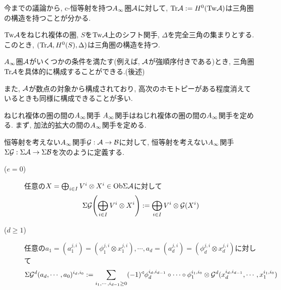 \documentclass[aspectratio=169, dvipdfmx, 8pt, notheorems, uplatex]{beamer}
\begin{document}
\begin{frame}
  今までの議論から, c-恒等射を持つ$A_\infty$圏$\mathcal{A}$に対して, $\mathrm{Tr}\mathcal{A} := H^0(\mathrm{Tw}\mathcal{A})$は三角圏の構造を持つことが分かる. 
  
  \begin{theorem}
    $\mathrm{Tw}\mathcal{A}$をねじれ複体の圏, $S$を$\mathrm{Tw}\mathcal{A}$上のシフト関手, $\Delta$を完全三角の集まりとする.
    このとき, $(\mathrm{Tr}\mathcal{A}, H^0(S), \Delta)$は三角圏の構造を持つ.
  \end{theorem}

  $A_\infty$圏$\mathcal{A}$がいくつかの条件を満たす(例えば, $\mathcal{A}$が強順序付きである)とき, 三角圏$\mathrm{Tr}\mathcal{A}$を具体的に構成することができる.(後述) \bigskip

  また, $\mathcal{A}$が数点の対象から構成されており, 高次のホモトピーがある程度消えているときも同様に構成できることが多い. 
\end{frame}



\begin{frame}{ねじれ複体の圏の間の$A_\infty$関手}
  $A_\infty$関手はねじれ複体の圏の間の$A_\infty$関手を定める. 
  まず, 加法的拡大の間の$A_\infty$関手を定める. 

  \begin{definition}
    恒等射を考えない$A_\infty$関手$\mathcal{G} : \mathcal{A} \to \mathcal{B}$に対して, 恒等射を考えない$A_\infty$関手$\Sigma\mathcal{G} : \Sigma\mathcal{A} \to \Sigma\mathcal{B}$を次のように定義する. 
    \begin{description}
      \item[($e=0$)] 任意の$X = \bigoplus_{i \in I} V^i \otimes X^i \in \mathrm{Ob}\Sigma\mathcal{A}$に対して
      \begin{align*}
        \Sigma\mathcal{G} \qty(\bigoplus_{i \in I} V^i \otimes X^i) 
        := \bigoplus_{i \in I} V^i \otimes \mathcal{G}(X^i)
      \end{align*}
      \item[($d \geq 1$)] 任意の$a_1 = (a_1^{j,i}) = (\phi_1^{j,i} \otimes x_1^{j,i}), \cdots, a_d = (a_d^{j,i}) = (\phi_d^{j,i} \otimes x_d^{j,i})$に対して
      \begin{align*}
        \Sigma\mathcal{G}^d (a_d,\cdots,a_0)^{i_d,i_0}
        := \sum_{i_1,\cdots,i_{d-1} \geq 0} (-1)^\triangleleft \phi_d^{i_d,i_{d-1}} \circ  \cdots \circ \phi_1^{i_1,i_0} \otimes \mathcal{G}^d(x_d^{i_d,i_{d-1}}, \cdots, x_1^{i_1,i_0})
      \end{align*}
    \end{description}
  \end{definition}
\end{frame}
\end{document}
